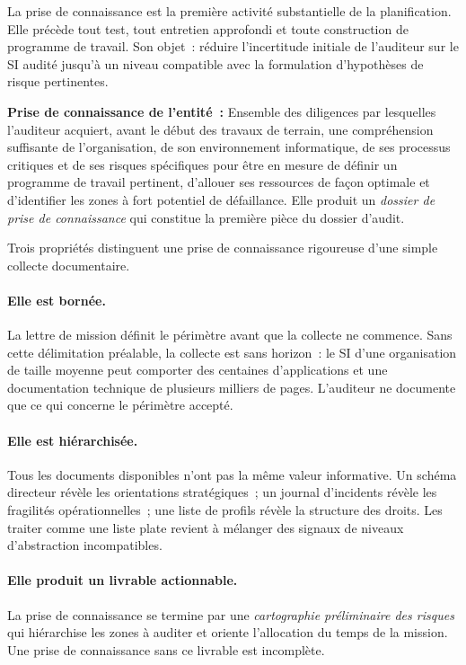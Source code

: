 La prise de connaissance est la première activité substantielle de la planification.
Elle précède tout test, tout entretien approfondi et toute construction de programme
de travail. Son objet~: réduire l'incertitude initiale de l'auditeur sur le SI audité
jusqu'à un niveau compatible avec la formulation d'hypothèses de risque pertinentes.

\begin{boxdef}
\textbf{Prise de connaissance de l'entité~:}
Ensemble des diligences par lesquelles l'auditeur acquiert, avant le début des travaux
de terrain, une compréhension suffisante de l'organisation, de son environnement
informatique, de ses processus critiques et de ses risques spécifiques pour être en
mesure de définir un programme de travail pertinent, d'allouer ses ressources de façon
optimale et d'identifier les zones à fort potentiel de défaillance. Elle produit un
\emph{dossier de prise de connaissance} qui constitue la première pièce du dossier
d'audit.
\end{boxdef}

Trois propriétés distinguent une prise de connaissance rigoureuse d'une simple collecte
documentaire.

\paragraph{Elle est bornée.}
La lettre de mission définit le périmètre avant que la collecte ne commence.
Sans cette délimitation préalable, la collecte est sans horizon~: le SI d'une
organisation de taille moyenne peut comporter des centaines d'applications et une
documentation technique de plusieurs milliers de pages. L'auditeur ne documente
que ce qui concerne le périmètre accepté.

\paragraph{Elle est hiérarchisée.}
Tous les documents disponibles n'ont pas la même valeur informative. Un schéma
directeur révèle les orientations stratégiques~; un journal d'incidents révèle les
fragilités opérationnelles~; une liste de profils révèle la structure des droits.
Les traiter comme une liste plate revient à mélanger des signaux de niveaux
d'abstraction incompatibles.

\paragraph{Elle produit un livrable actionnable.}
La prise de connaissance se termine par une \emph{cartographie préliminaire des
risques} qui hiérarchise les zones à auditer et oriente l'allocation du temps de
la mission. Une prise de connaissance sans ce livrable est incomplète.


